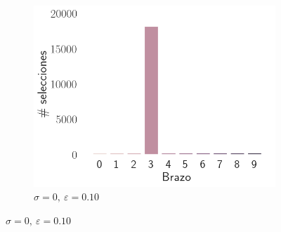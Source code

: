 \documentclass[12pt]{article}
\begin{document}
\begin{figure}[H]
\begin{subfigure}[H]{0.3\textwidth}
            \includegraphics[width=\textwidth]{../img/arm_sigma_0_epsilon_0.1}
            \caption{$\sigma=0 ,\ \varepsilon=0.10$}
            \label{fig:arms_selected_0_0.1}
        \end{subfigure}


\end{figure}
\end{document}
